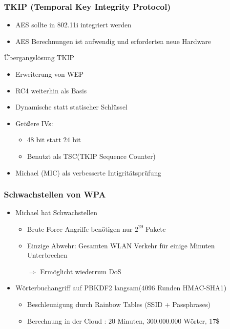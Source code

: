 \documentclass{beamer}
\begin{document}
\begin{frame}
\frametitle{TKIP (Temporal Key Integrity Protocol)}
\begin{itemize}
	\item AES sollte in 802.11i integriert werden
	\item AES Berechnungen ist aufwendig und erforderten neue Hardware
\end{itemize}
\begin{block}{Übergangslösung TKIP}
	\begin{itemize}
		\item Erweiterung von WEP
		\item RC4 weiterhin als Basis
		\item Dynamische statt statischer Schlüssel
		\item Größere IVs:
		\begin{itemize}
			\item 48 bit statt 24 bit
			\item Benutzt als TSC(TKIP Sequence Counter)
		\end{itemize}
		\item Michael (MIC) als verbesserte Intigritätsprüfung
	\end{itemize}
\end{block}
\end{frame}

\begin{frame}
\frametitle{Schwachstellen von WPA}
\begin{itemize}
	\item Michael hat Schwachstellen
	\begin{itemize}
		\item Brute Force Angriffe benötigen nur $2^{29}$ Pakete
		\item Einzige Abwehr: Gesamten WLAN Verkehr für einige Minuten Unterbrechen
		\item[$\Rightarrow$] Ermöglicht wiederrum DoS
	\end{itemize}
	\item Wörterbuchangriff auf PBKDF2 langsam(4096 Runden HMAC-SHA1)
	\begin{itemize}
		\item Beschleunigung durch Rainbow Tables \cite{renderlab} (SSID + Passphrases)
		\item Berechnung in der Cloud \cite{cloudcracker}: 20 Minuten, 300.000.000 Wörter, 17\$
	\end{itemize}
\end{itemize}
\end{frame}
\end{document}
